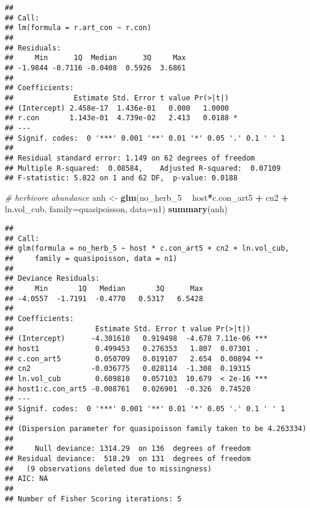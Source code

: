 \documentclass[]{article}
\newenvironment{Shaded}{\begin{snugshade}}{\end{snugshade}}
\newcommand{\KeywordTok}[1]{\textcolor[rgb]{0.13,0.29,0.53}{\textbf{#1}}}
\newcommand{\DataTypeTok}[1]{\textcolor[rgb]{0.13,0.29,0.53}{#1}}
\newcommand{\DecValTok}[1]{\textcolor[rgb]{0.00,0.00,0.81}{#1}}
\newcommand{\StringTok}[1]{\textcolor[rgb]{0.31,0.60,0.02}{#1}}
\newcommand{\CommentTok}[1]{\textcolor[rgb]{0.56,0.35,0.01}{\textit{#1}}}
\newcommand{\OperatorTok}[1]{\textcolor[rgb]{0.81,0.36,0.00}{\textbf{#1}}}
\newcommand{\NormalTok}[1]{#1}
\begin{document}
\begin{Shaded}
\end{Shaded}

\begin{verbatim}
## 
## Call:
## lm(formula = r.art_con ~ r.con)
## 
## Residuals:
##     Min      1Q  Median      3Q     Max 
## -1.9844 -0.7116 -0.0408  0.5926  3.6861 
## 
## Coefficients:
##              Estimate Std. Error t value Pr(>|t|)  
## (Intercept) 2.458e-17  1.436e-01   0.000   1.0000  
## r.con       1.143e-01  4.739e-02   2.413   0.0188 *
## ---
## Signif. codes:  0 '***' 0.001 '**' 0.01 '*' 0.05 '.' 0.1 ' ' 1
## 
## Residual standard error: 1.149 on 62 degrees of freedom
## Multiple R-squared:  0.08584,    Adjusted R-squared:  0.07109 
## F-statistic: 5.822 on 1 and 62 DF,  p-value: 0.0188
\end{verbatim}

\begin{Shaded}
\begin{Highlighting}[]
\CommentTok{# herbivore abundance}
\NormalTok{anh <-}\StringTok{ }\KeywordTok{glm}\NormalTok{(no_herb_}\DecValTok{5} \OperatorTok{~}\StringTok{ }\NormalTok{host}\OperatorTok{*}\NormalTok{c.con_art5 }\OperatorTok{+}\StringTok{ }\NormalTok{cn2 }\OperatorTok{+}\StringTok{ }\NormalTok{ln.vol_cub, }
           \DataTypeTok{family=}\NormalTok{quasipoisson, }\DataTypeTok{data=}\NormalTok{n1)}
\KeywordTok{summary}\NormalTok{(anh)}
\end{Highlighting}
\end{Shaded}

\begin{verbatim}
## 
## Call:
## glm(formula = no_herb_5 ~ host * c.con_art5 + cn2 + ln.vol_cub, 
##     family = quasipoisson, data = n1)
## 
## Deviance Residuals: 
##     Min       1Q   Median       3Q      Max  
## -4.0557  -1.7191  -0.4770   0.5317   6.5428  
## 
## Coefficients:
##                   Estimate Std. Error t value Pr(>|t|)    
## (Intercept)      -4.301610   0.919498  -4.678 7.11e-06 ***
## host1             0.499453   0.276353   1.807  0.07301 .  
## c.con_art5        0.050709   0.019107   2.654  0.00894 ** 
## cn2              -0.036775   0.028114  -1.308  0.19315    
## ln.vol_cub        0.609810   0.057103  10.679  < 2e-16 ***
## host1:c.con_art5 -0.008761   0.026901  -0.326  0.74520    
## ---
## Signif. codes:  0 '***' 0.001 '**' 0.01 '*' 0.05 '.' 0.1 ' ' 1
## 
## (Dispersion parameter for quasipoisson family taken to be 4.263334)
## 
##     Null deviance: 1314.29  on 136  degrees of freedom
## Residual deviance:  518.29  on 131  degrees of freedom
##   (9 observations deleted due to missingness)
## AIC: NA
## 
## Number of Fisher Scoring iterations: 5
\end{verbatim}
\end{document}
